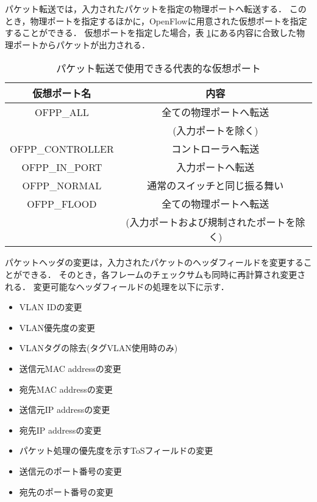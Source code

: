 パケット転送では，入力されたパケットを指定の物理ポートへ転送する．
このとき，物理ポートを指定するほかに，OpenFlowに用意された仮想ポートを指定することができる．
仮想ポートを指定した場合，表 \ref{tab:2-2}にある内容に合致した物理ポートからパケットが出力される．


\begin{table}[tb]
	\begin{center}
		\caption{パケット転送で使用できる代表的な仮想ポート}
		\begin{tabular}{c|c}
			\hline \hline
			仮想ポート名 & 内容　\\ \hline
			OFPP\_ALL & 全ての物理ポートへ転送　\\
			　& (入力ポートを除く)　\\
			OFPP\_CONTROLLER & コントローラへ転送 \\
			OFPP\_IN\_PORT & 入力ポートへ転送　\\
			OFPP\_NORMAL & 通常のスイッチと同じ振る舞い　\\
			OFPP\_FLOOD & 全ての物理ポートへ転送　\\
			 & (入力ポートおよび規制されたポートを除く) \\ \hline
		\end{tabular}
		\label{tab:2-2}
	\end{center}
\end{table}

パケットヘッダの変更は，入力されたパケットのヘッダフィールドを変更することができる．
そのとき，各フレームのチェックサムも同時に再計算され変更される．
変更可能なヘッダフィールドの処理を以下に示す．

\begin{itemize}
	\item VLAN IDの変更
	\item VLAN優先度の変更
	\item VLANタグの除去(タグVLAN使用時のみ)
	\item 送信元MAC addressの変更
	\item 宛先MAC addressの変更
	\item 送信元IP addressの変更
	\item 宛先IP addressの変更
	\item パケット処理の優先度を示すToSフィールドの変更
	\item 送信元のポート番号の変更
	\item 宛先のポート番号の変更
\end{itemize}

